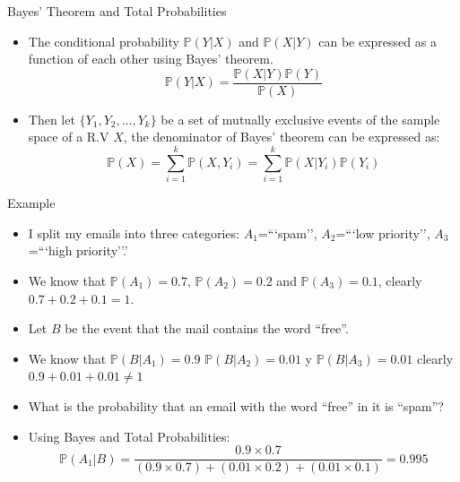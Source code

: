 \documentclass[handout]{beamer}
\begin{document}
\begin{frame}{Bayes' Theorem and Total Probabilities}
\scriptsize{
\begin{itemize}
 \item The conditional probability $\mathbb{P}(Y|X)$ and $\mathbb{P}(X|Y)$ can be expressed as a function of each other using Bayes' theorem.
\begin{displaymath}
 \mathbb{P}(Y|X)=\frac{\mathbb{P}(X|Y)\mathbb{P}(Y)}{\mathbb{P}(X)}
\end{displaymath}
\item Then let $\{ Y_1,Y_2,\dots, Y_k \} $ be a set of mutually exclusive events of the sample space of a R.V $X$, the denominator of Bayes' theorem can be expressed as:
\begin{displaymath}
\mathbb{P}(X)= \sum_{i=1}^{k} \mathbb{P}(X,Y_i) = \sum_{i=1}^{k} \mathbb{P}(X|Y_i)\mathbb{P}(Y_i)
\end{displaymath}
\end{itemize}
 
}
\end{frame}

\begin{frame}{Example}
\scriptsize{
\begin{itemize}
 \item I split my emails into three categories: $A_1$=```spam'', $A_2$=```low priority'', $A_3$=```high priority''.'
 \item We know that $\mathbb{P}(A_1)=0.7$, $\mathbb{P}(A_2)=0.2$ and $\mathbb{P}(A_3)=0.1$, clearly $0.7+0.2+0.1=1$.
 \item Let $B$ be the event that the mail contains the word ``free''.
 \item We know that $\mathbb{P}(B|A_1)=0.9$ $\mathbb{P}(B|A_2)=0.01$ y $\mathbb{P}(B|A_3)=0.01$ clearly $0.9+0.01+0.01 \neq 1$
 \item  What is the probability that an email with the word ``free'' in it is ``spam''?
 \item Using Bayes and Total Probabilities:
 \begin{displaymath}
  \mathbb{P}(A_1|B) = \frac{0.9 \times 0.7}{(0.9 \times 0.7) + (0.01 \times 0.2) + (0.01 \times 0.1)} = 0.995
 \end{displaymath}



\end{itemize}




} 
\end{frame}
\end{document}
